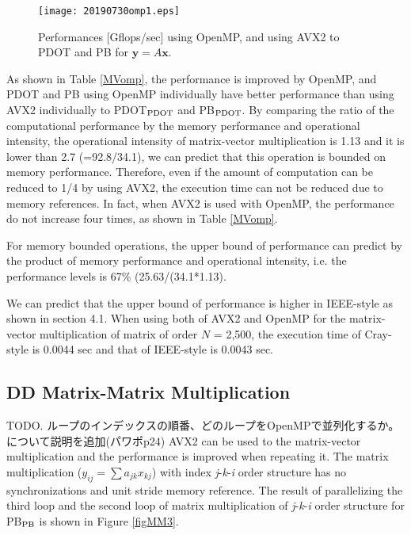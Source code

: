 \documentclass{IOS-Book-Article}
\begin{document}
\begin{figure}[htbp]
  \begin{center}
    \texttt{[image: 20190730omp1.eps]}
        \caption{Performances [Gflops/sec] using OpenMP, and using AVX2 to PDOT and PB for $\bm{y} = A\bm{x}$.}
    \label{figMM}
  \end{center}
\end{figure}


As shown in Table \ref{MVomp}, the performance is improved by OpenMP, and PDOT and PB using OpenMP individually have better performance than using AVX2 individually to PDOT$_{\rm{PDOT}}$ and PB$_{\rm{PDOT}}$. 
By comparing the ratio of the computational performance by the memory performance and operational intensity, the operational intensity of matrix-vector multiplication is 1.13 and it is lower than 2.7 (=92.8/34.1), we can predict that this operation is bounded on memory performance.
Therefore, even if the amount of computation can be reduced to 1/4 by using AVX2, the execution time can not be reduced due to memory references. 
In fact, when AVX2 is used with OpenMP, the performance do not increase four times, as shown in Table \ref{MVomp}.

For memory bounded operations, the upper bound of performance can predict by the product of memory performance and operational intensity, i.e. the performance levels is 67\% (25.63/(34.1*1.13).

We can predict that the upper bound of performance is higher in IEEE-style as shown in section 4.1. When using both of AVX2 and OpenMP for the matrix-vector multiplication of matrix of order $N$ = 2,500, the execution time of Cray-style is 0.0044 sec and that of IEEE-style is 0.0043 sec.

\subsection{DD Matrix-Matrix Multiplication}
TODO. ループのインデックスの順番、どのループをOpenMPで並列化するか。について説明を追加(パワポp24)
AVX2 can be used to the matrix-vector multiplication and the performance is improved when repeating it. The matrix multiplication ($y_{ij}=\sum a_{jk}x_{kj}$) with index {\it j}-{\it k}-{\it i} order structure has no synchronizations and unit stride memory reference.
The result of parallelizing the third loop and the second loop of matrix multiplication of {\it j}-{\it k}-{\it i} order structure for PB$_{\rm{PB}}$ is shown in Figure \ref{figMM3}.
\end{document}
